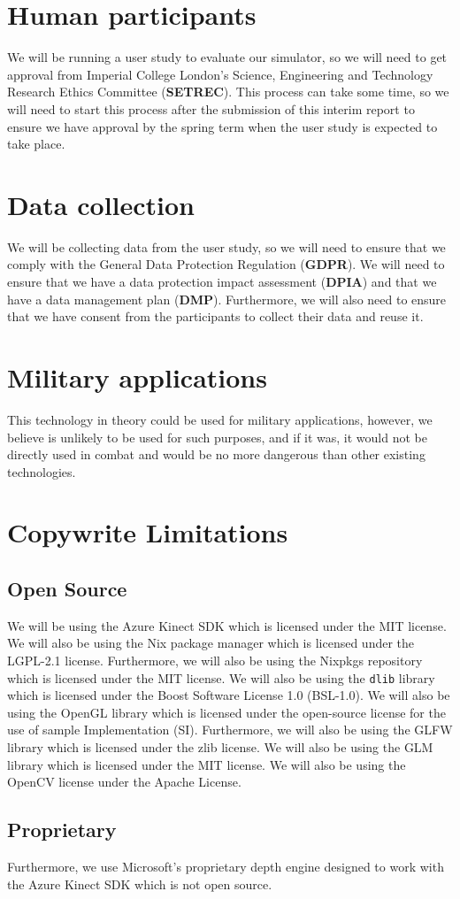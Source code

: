 \section{Human participants}
We will be running a user study to evaluate our simulator, so we will need to get approval from Imperial College London's Science, Engineering and Technology Research Ethics Committee (\textbf{SETREC}). This process can take some time, so we will need to start this process after the submission of this interim report to ensure we have approval by the spring term when the user study is expected to take place. 

\section{Data collection}
We will be collecting data from the user study, so we will need to ensure that we comply with the General Data Protection Regulation (\textbf{GDPR}). We will need to ensure that we have a data protection impact assessment (\textbf{DPIA}) and that we have a data management plan (\textbf{DMP}). Furthermore, we will also need to ensure that we have consent from the participants to collect their data and reuse it.

\section{Military applications}
This technology in theory could be used for military applications, however, we believe is unlikely to be used for such purposes, and if it was, it would not be directly used in combat and would be no more dangerous than other existing technologies.

\section{Copywrite Limitations}
\subsection{Open Source}
We will be using the Azure Kinect SDK which is licensed under the MIT license. We will also be using the Nix package manager which is licensed under the LGPL-2.1 license. Furthermore, we will also be using the Nixpkgs repository which is licensed under the MIT license. We will also be using the \texttt{dlib} library which is licensed under the Boost Software License 1.0 (BSL-1.0). We will also be using the OpenGL library which is licensed under the open-source license for the use of sample Implementation (SI). Furthermore, we will also be using the GLFW library which is licensed under the zlib license. We will also be using the GLM library which is licensed under the MIT license. We will also be using the OpenCV license under the Apache License. 
\subsection{Proprietary}
Furthermore, we use Microsoft's proprietary depth engine designed to work with the Azure Kinect SDK which is not open source.